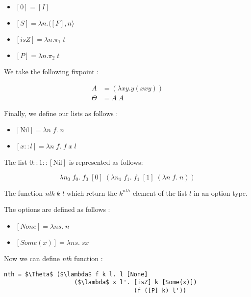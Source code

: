 \documentclass{article}
\theoremstyle{plain}
\newcommand{\nil}{[\text{Nil}]}
\newcommand{\nth}{\textit{nth}}
\begin{document}
  \begin{multicols}{2}
    \begin{itemize}
      \item $[0] = [I]$
      \item $[S] = \lambda n. \langle [F], n\rangle$
      \item $[\textit{isZ}] = \lambda n. \pi_1\;t$
      \item $[P] = \lambda n. \pi_2\;t$
    \end{itemize}
  \end{multicols}

  We take the following fixpoint :

  \begin{align*}
    A &= (\lambda xy.y(xxy)) \\
    \Theta &= A\;A
  \end{align*}

  Finally, we define our lists as follows :

  \begin{itemize}
    \item $\nil = \lambda n\;f.\; n$
    \item $[x :: l] = \lambda n\;f.\; f\; x\; l$
  \end{itemize}

  \begin{center}
    The list $0 :: 1 :: \nil$ is represented as follows:
  \end{center}
  $$\lambda n_0\; f_0.\; f_0\; [0]\; (\lambda n_1\;f_1.\; f_1\;[1]\;(\lambda
  n\;f.\;n))$$

  The function \nth $\;k$ $l$ which return the
  $k^{nth}$ element of the list $l$ in an option type.

  The options are defined as follows :

  \begin{itemize}
    \item $[\textit{None}] = \lambda n s.\;n$
    \item $[\textit{Some}(x)] = \lambda n s.\;s x$
  \end{itemize}

  Now we can define \textit{nth} function :

    \begin{lstlisting}[caption=Nth function on list, mathescape=true]
nth = $\Theta$ ($\lambda$ f k l. l [None]
                    ($\lambda$ x l'. [isZ] k [Some(x)])
                                     (f ([P] k) l'))
    \end{lstlisting}
\end{document}

